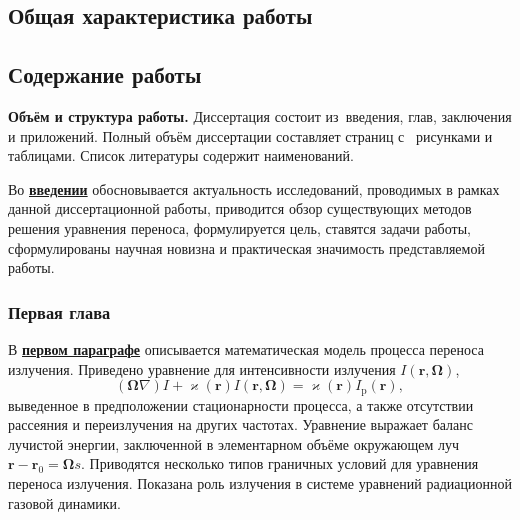 \subsection*{Общая характеристика работы}


\newcommand{\contribution}{{\textbf{Личный вклад автора в публикации с соавторами.}}}


\newcommand{\epar}[1]{\underline{\textbf{#1}}}

\subsection*{Содержание работы}
\textbf{Объём и структура работы.} Диссертация состоит из~введения,  глав, заключения и  приложений. Полный объём диссертации составляет  страниц
с~ рисунками и  таблицами. Список литературы содержит  наименований.

Во \epar{введении} обосновывается актуальность исследований, проводимых в рамках данной диссертационной работы, приводится обзор существующих методов решения уравнения переноса, формулируется цель, ставятся задачи работы, сформулированы научная новизна и практическая значимость представляемой работы.


\subsubsection*{Первая глава}
В \epar{первом параграфе} описывается математическая модель процесса переноса излучения. Приведено уравнение для интенсивности излучения $I(\mathbf r, \boldsymbol \Omega)$, 
\[
(\boldsymbol \Omega  \nabla) I + \varkappa(\mathbf r) I(\mathbf r, \boldsymbol \Omega) = \varkappa(\mathbf r) I_\text{p}(\mathbf r),
\]
выведенное в предположении стационарности процесса, а также отсутствии рассеяния и переизлучения на других частотах. Уравнение выражает баланс лучистой энергии, заключенной в элементарном объёме окружающем луч $\mathbf r - \mathbf r_0 = \boldsymbol \Omega s$. Приводятся несколько типов граничных условий для уравнения переноса излучения. Показана роль излучения в системе уравнений радиационной газовой динамики. 

